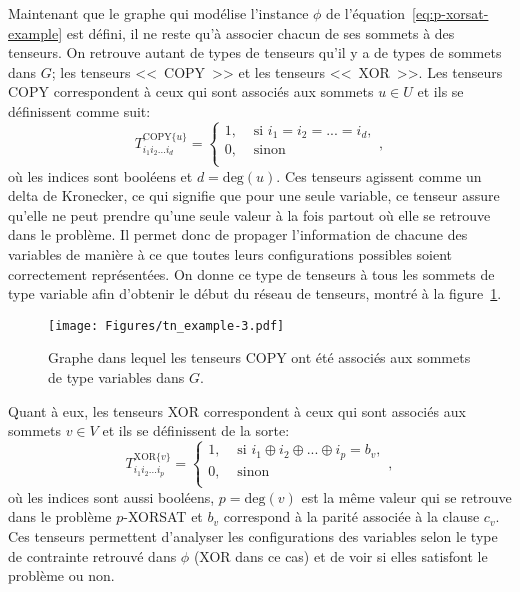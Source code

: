 Maintenant que le graphe qui modélise l'instance $\phi$ de l'équation~\ref{eq:p-xorsat-example} est défini, il ne reste qu'à associer chacun de ses sommets à des tenseurs.
On retrouve autant de types de tenseurs qu'il y a de types de sommets dans $G$; les tenseurs <<~COPY~>> et les tenseurs <<~XOR~>>.
Les tenseurs COPY correspondent à ceux qui sont associés aux sommets $u \in U$ et ils se définissent comme suit:
\begin{equation}\label{eq:COPY}
    T^{\text{COPY}\{u\}}_{i_1i_2...i_d} = \begin{cases}
        1, & \text{ si } i_1 = i_2 = ... = i_d,\\
        0, & \text{ sinon}\\
    \end{cases},
\end{equation}
où les indices sont booléens et $d = \mathrm{deg}(u)$.
Ces tenseurs agissent comme un delta de Kronecker, ce qui signifie que pour une seule variable, ce tenseur assure qu'elle ne peut prendre qu'une seule valeur à la fois partout où elle se retrouve dans le problème.
Il permet donc de propager l'information de chacune des variables de manière à ce que toutes leurs configurations possibles soient correctement représentées.
On donne ce type de tenseurs à tous les sommets de type variable afin d'obtenir le début du réseau de tenseurs, montré à la figure~\ref{fig:tn-example3}.
\begin{figure}[h]
    \centering
    \texttt{[image: Figures/tn\_example-3.pdf]}
    \caption{Graphe dans lequel les tenseurs COPY ont été associés aux sommets de type variables dans $G$.}
    \label{fig:tn-example3}
\end{figure}
Quant à eux, les tenseurs XOR correspondent à ceux qui sont associés aux sommets $v \in V$ et ils se définissent de la sorte:
\begin{equation} \label{eq:XOR-tensor}
    T^{\text{XOR}\{v\}}_{i_1i_2...i_p} = \begin{cases}
        1, & \text{ si } i_1 \oplus i_2 \oplus ... \oplus i_p = b_v,\\
        0, & \text{ sinon}\\
    \end{cases},
\end{equation}
où les indices sont aussi booléens, $p = \mathrm{deg}(v)$ est la même valeur qui se retrouve dans le problème $p$-XORSAT et $b_v$ correspond à la parité associée à la clause $c_v$.
Ces tenseurs permettent d'analyser les configurations des variables selon le type de contrainte retrouvé dans $\phi$ (XOR dans ce cas) et de voir si elles satisfont le problème ou non.
